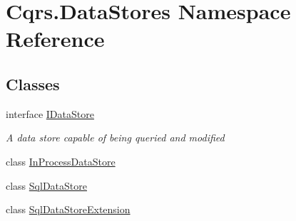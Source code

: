 \hypertarget{namespaceCqrs_1_1DataStores}{}\section{Cqrs.\+Data\+Stores Namespace Reference}
\label{namespaceCqrs_1_1DataStores}
\subsection*{Classes}
\begin{DoxyCompactItemize}
\item 
interface \hyperlink{interfaceCqrs_1_1DataStores_1_1IDataStore}{I\+Data\+Store}
\begin{DoxyCompactList}\small\item\em A data store capable of being queried and modified \end{DoxyCompactList}\item 
class \hyperlink{classCqrs_1_1DataStores_1_1InProcessDataStore}{In\+Process\+Data\+Store}
\item 
class \hyperlink{classCqrs_1_1DataStores_1_1SqlDataStore}{Sql\+Data\+Store}
\item 
class \hyperlink{classCqrs_1_1DataStores_1_1SqlDataStoreExtension}{Sql\+Data\+Store\+Extension}
\end{DoxyCompactItemize}
